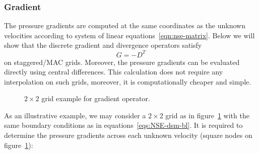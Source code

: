 \documentclass{article}
\begin{document}
\subsubsection{Gradient}\label{subsec:gradient} 

The pressure gradients are computed at the same coordinates as the unknown velocities according to system of linear equations~\eqref{eqn:nse-matrix}. Below we will show that the discrete gradient and divergence operators satisfy
\begin{equation}\label{eqn:g-dt}
  {G}=-{D^T}
\end{equation}
on staggered/MAC grids. Moreover, the pressure gradients can be evaluated directly using central differences. This calculation does not require any interpolation on such grids, moreover, it is computationally cheaper and simple.

\begin{figure}[H] %
  \caption{$2\times 2$ grid example for gradient operator.}\label{fig:G-example-2x2}
\end{figure}


As an illustrative example, we may consider a $2\times 2$ grid as in figure~\ref{fig:G-example-2x2} with the same boundary conditions as in equations~\eqref{eqs:NSE-dsm-bl}. It is required to determine the pressure gradients across each unknown velocity (square nodes on figure~\ref{fig:G-example-2x2}):
\end{document}
